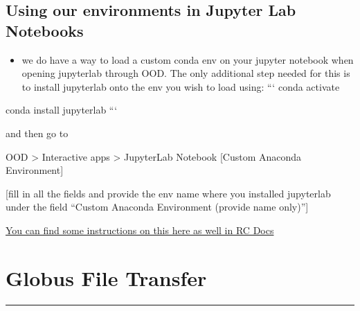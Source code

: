 \documentclass[
  letterpaper,
  DIV=11,
  numbers=noendperiod]{scrreprt}
\providecommand{\tightlist}{%
  \setlength{\itemsep}{0pt}\setlength{\parskip}{0pt}}\usepackage{longtable,booktabs,array}
\begin{document}
\hypertarget{using-our-environments-in-jupyter-lab-notebooks}{%
\section*{\texorpdfstring{\textbf{Using our environments in Jupyter Lab
Notebooks}}{Using our environments in Jupyter Lab Notebooks}}\label{using-our-environments-in-jupyter-lab-notebooks}}

\begin{itemize}
\tightlist
\item
  we do have a way to load a custom conda env on your jupyter notebook
  when opening jupyterlab through OOD. The only additional step needed
  for this is to install jupyterlab onto the env you wish to load using:
  ``` conda activate
\end{itemize}

conda install jupyterlab ```

and then go to

OOD \textgreater{} Interactive apps \textgreater{} JupyterLab Notebook
{[}Custom Anaconda Environment{]}

{[}fill in all the fields and provide the env name where you installed
jupyterlab under the field ``Custom Anaconda Environment (provide name
only)''{]}

\href{https://rc-docs.northeastern.edu/en/latest/using-ood/interactiveapps.html\#working-with-jupyter-notebook-custom-anaconda-environment}{You
can find some instructions on this here as well in RC Docs}

\hypertarget{globus-file-transfer}{%
\chapter{Globus File Transfer}\label{globus-file-transfer}}

\begin{center}\rule{0.5\linewidth}{0.5pt}\end{center}
\end{document}
